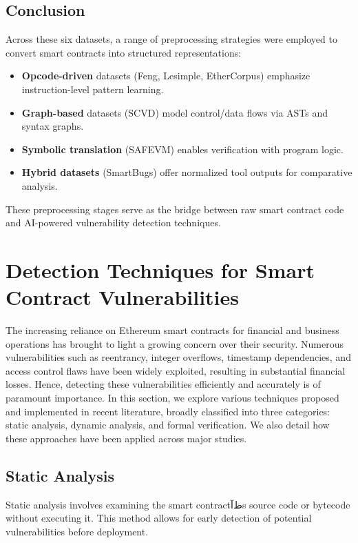 \subsection*{Conclusion}

Across these six datasets, a range of preprocessing strategies were employed to convert smart contracts into structured representations:

\begin{itemize}
    \item \textbf{Opcode-driven} datasets (Feng, Lesimple, EtherCorpus) emphasize instruction-level pattern learning.
    \item \textbf{Graph-based} datasets (SCVD) model control/data flows via ASTs and syntax graphs.
    \item \textbf{Symbolic translation} (SAFEVM) enables verification with program logic.
    \item \textbf{Hybrid datasets} (SmartBugs) offer normalized tool outputs for comparative analysis.
\end{itemize}

These preprocessing stages serve as the bridge between raw smart contract code and AI-powered vulnerability detection techniques.

\section{Detection Techniques for Smart Contract Vulnerabilities}
The increasing reliance on Ethereum smart contracts for financial and business operations has brought to light a growing concern over their security. Numerous vulnerabilities such as reentrancy, integer overflows, timestamp dependencies, and access control flaws have been widely exploited, resulting in substantial financial losses. Hence, detecting these vulnerabilities efficiently and accurately is of paramount importance. In this section, we explore various techniques proposed and implemented in recent literature, broadly classified into three categories: static analysis, dynamic analysis, and formal verification. We also detail how these approaches have been applied across major studies.
\subsection*{Static Analysis}

Static analysis involves examining the smart contractظآs source code or bytecode without executing it. This method allows for early detection of potential vulnerabilities before deployment.


